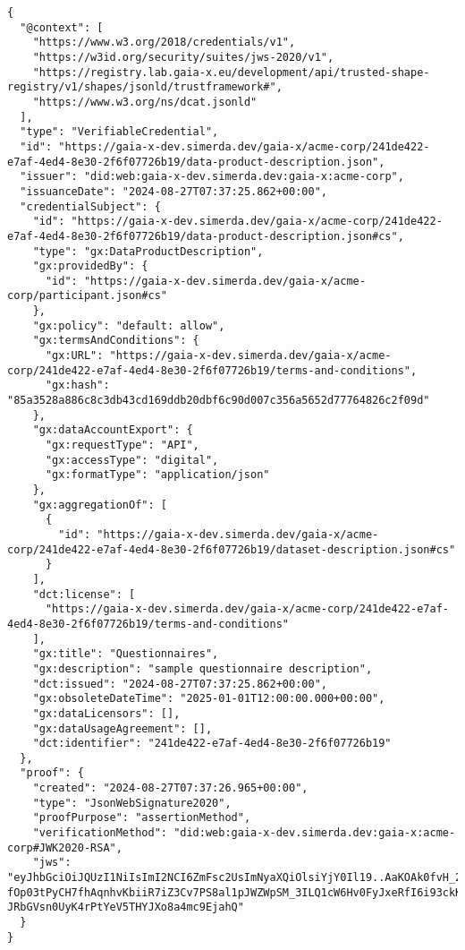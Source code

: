 \begin{verbatim}
{
  "@context": [
    "https://www.w3.org/2018/credentials/v1",
    "https://w3id.org/security/suites/jws-2020/v1",
    "https://registry.lab.gaia-x.eu/development/api/trusted-shape-registry/v1/shapes/jsonld/trustframework#",
    "https://www.w3.org/ns/dcat.jsonld"
  ],
  "type": "VerifiableCredential",
  "id": "https://gaia-x-dev.simerda.dev/gaia-x/acme-corp/241de422-e7af-4ed4-8e30-2f6f07726b19/data-product-description.json",
  "issuer": "did:web:gaia-x-dev.simerda.dev:gaia-x:acme-corp",
  "issuanceDate": "2024-08-27T07:37:25.862+00:00",
  "credentialSubject": {
    "id": "https://gaia-x-dev.simerda.dev/gaia-x/acme-corp/241de422-e7af-4ed4-8e30-2f6f07726b19/data-product-description.json#cs",
    "type": "gx:DataProductDescription",
    "gx:providedBy": {
      "id": "https://gaia-x-dev.simerda.dev/gaia-x/acme-corp/participant.json#cs"
    },
    "gx:policy": "default: allow",
    "gx:termsAndConditions": {
      "gx:URL": "https://gaia-x-dev.simerda.dev/gaia-x/acme-corp/241de422-e7af-4ed4-8e30-2f6f07726b19/terms-and-conditions",
      "gx:hash": "85a3528a886c8c3db43cd169ddb20dbf6c90d007c356a5652d77764826c2f09d"
    },
    "gx:dataAccountExport": {
      "gx:requestType": "API",
      "gx:accessType": "digital",
      "gx:formatType": "application/json"
    },
    "gx:aggregationOf": [
      {
        "id": "https://gaia-x-dev.simerda.dev/gaia-x/acme-corp/241de422-e7af-4ed4-8e30-2f6f07726b19/dataset-description.json#cs"
      }
    ],
    "dct:license": [
      "https://gaia-x-dev.simerda.dev/gaia-x/acme-corp/241de422-e7af-4ed4-8e30-2f6f07726b19/terms-and-conditions"
    ],
    "gx:title": "Questionnaires",
    "gx:description": "sample questionnaire description",
    "dct:issued": "2024-08-27T07:37:25.862+00:00",
    "gx:obsoleteDateTime": "2025-01-01T12:00:00.000+00:00",
    "gx:dataLicensors": [],
    "gx:dataUsageAgreement": [],
    "dct:identifier": "241de422-e7af-4ed4-8e30-2f6f07726b19"
  },
  "proof": {
    "created": "2024-08-27T07:37:26.965+00:00",
    "type": "JsonWebSignature2020",
    "proofPurpose": "assertionMethod",
    "verificationMethod": "did:web:gaia-x-dev.simerda.dev:gaia-x:acme-corp#JWK2020-RSA",
    "jws": "eyJhbGciOiJQUzI1NiIsImI2NCI6ZmFsc2UsImNyaXQiOlsiYjY0Il19..AaKOAk0fvH_2PSSqFuovaSb87zm5klo3lGv8gVMOH5vohEckgsjoeObbdHEQRZbw5s6TPhhIkP9uAWz9KA1wigk2vjRvo1b9Pmwurk_6SG-fOp03tPyCH7fhAqnhvKbiiR7iZ3Cv7PS8al1pJWZWpSM_3ILQ1cW6Hv0FyJxeRfI6i93ckK0DCL0htQbTIUwBuDaTEJKnZh2vA1zVhXuKr4pXt1uk3oFgMnC63zc5E07XkJh_7Aum7INd3XSQWh3uayWsdRMfb2DSBeMkqTX9Tk3Veth7c_nX6fMc_cMj9JF1o9vQg-JRbGVsn0UyK4rPtYeV5THYJXo8a4mc9EjahQ"
  }
}
\end{verbatim}

